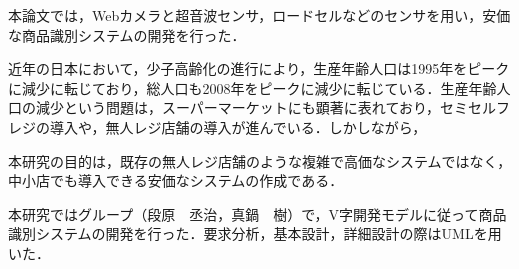 


本論文では，Webカメラと超音波センサ，ロードセルなどのセンサを用い，安価な商品識別システムの開発を行った．

近年の日本において，少子高齢化の進行により，生産年齢人口は1995年をピークに減少に転じており，総人口も2008年をピークに減少に転じている\cite{population}．生産年齢人口の減少という問題は，スーパーマーケットにも顕著に表れており，セミセルフレジの導入や，無人レジ店舗の導入が進んでいる．しかしながら，


本研究の目的は，既存の無人レジ店舗のような複雑で高価なシステムではなく，中小店でも導入できる安価なシステムの作成である．

本研究ではグループ（段原　丞治，真鍋　樹）で，V字開発モデルに従って商品識別システムの開発を行った．要求分析，基本設計，詳細設計の際はUMLを用いた．